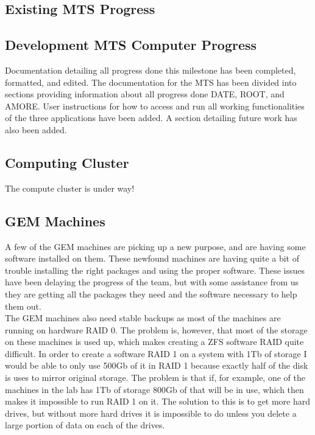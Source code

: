 \documentclass[12pt]{article}
\newcommand\tab[1][1cm]{\hspace*{#1}}
\begin{document}
\subsection{Existing MTS Progress}

\tab 

\subsection{Development MTS Computer Progress}

\tab Documentation detailing all progress done this milestone has been completed, formatted, and edited. The documentation for the MTS has been divided into sections providing information about all progress done DATE, ROOT, and AMORE. User instructions for how to access and run all working functionalities of the three applications have been added. A section detailing future work has also been added.

\subsection{Computing Cluster}

\tab The compute cluster is under way! 

\subsection{GEM Machines}

\tab A few of the GEM machines are picking up a new purpose, and are having some software
installed on them. These newfound machines are having quite a bit of trouble installing the 
right packages and using the proper software. These issues have been delaying the progress of
the team, but with some assistance from us they are getting all the packages they need and the 
software necessary to help them out. \\

\tab The GEM machines also need stable backups as most of the machines are running on hardware
RAID 0. The problem is, however, that most of the storage on these machines is used up, which 
makes creating a ZFS software RAID quite difficult. In order to create a software RAID 1 on a system with 1Tb of storage I would be able to only use 500Gb of it in RAID 1 because exactly half
of the disk is uses to mirror original storage. The problem is that if, for example, one of the
machines in the lab has 1Tb of storage 800Gb of that will be in use, which then makes it
impossible to run RAID 1 on it. The solution to this is to get more hard drives, but without more
hard drives it is impossible to do unless you delete a large portion of data on each of the drives. 
\end{document}
